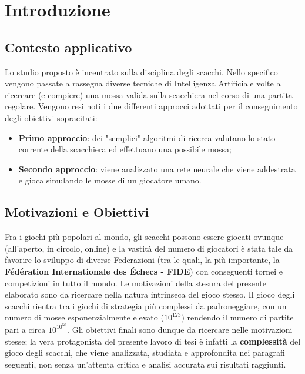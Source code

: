 \chapter{Introduzione}
\section{Contesto applicativo}
Lo studio proposto è incentrato sulla disciplina degli scacchi. Nello specifico vengono passate a rassegna diverse tecniche di 
Intelligenza Artificiale volte a ricercare (e compiere) una mossa valida sulla scacchiera nel corso di una partita regolare.
Vengono resi noti i due differenti approcci adottati per il conseguimento degli obiettivi sopracitati: 
\begin{itemize}
    \item \textbf{Primo approccio}: dei "semplici" algoritmi di ricerca valutano lo stato corrente della scacchiera ed effettuano una 
    possibile mossa;
    \item \textbf{Secondo approccio}: viene analizzato una rete neurale che viene addestrata e gioca simulando le 
    mosse di un giocatore umano. 
\end{itemize}

\section{Motivazioni e Obiettivi} %
Fra i giochi più popolari al mondo, gli scacchi possono essere giocati ovunque (all'aperto, in circolo, online) e la vastità del numero di 
giocatori è stata tale da favorire lo sviluppo di diverse Federazioni (tra le quali, la più importante, la 
\textbf{Fédération Internationale des Échecs - FIDE}) con conseguenti tornei e competizioni in tutto il mondo. 
Le motivazioni della stesura del presente elaborato sono da ricercare nella natura intrinseca del gioco stesso. Il gioco degli scacchi rientra
tra i giochi di strategia più complessi da padroneggiare, con un numero di mosse esponenzialmente elevato ($10^{123}$) rendendo il numero 
di partite pari a circa $10^{10^{50}}$. Gli obiettivi finali sono dunque da ricercare nelle motivazioni stesse; la vera protagonista del
presente lavoro di tesi è infatti la \textbf{complessità} del gioco degli scacchi, che viene analizzata, studiata e approfondita nei paragrafi
seguenti, non senza un'attenta critica e analisi accurata sui risultati raggiunti.

